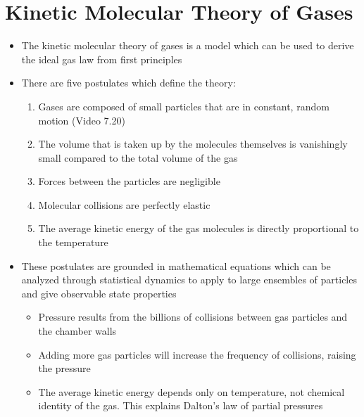 \documentclass[12pt, openany, letterpaper]{memoir}
\begin{document}
\section{Kinetic Molecular Theory of Gases}
\begin{itemize}
	\item The kinetic molecular theory of gases is a model which can be used to derive the ideal gas law from first principles
	\item There are five postulates which define the theory:
	      \begin{enumerate}
		      \item Gases are composed of small particles that are in constant, random motion (Video 7.20)
		      \item The volume that is taken up by the molecules themselves is vanishingly small compared to the total volume of the gas
		      \item Forces between the particles are negligible
		      \item Molecular collisions are perfectly elastic
		      \item The average kinetic energy of the gas molecules is directly proportional to the temperature
	      \end{enumerate}
	\item These postulates are grounded in mathematical equations which can be analyzed through statistical dynamics to apply to large ensembles of particles and give observable state properties
	      \begin{itemize}
		      \item Pressure results from the billions of collisions between gas particles and the chamber walls
		      \item Adding more gas particles will increase the frequency of collisions, raising the pressure
		      \item The average kinetic energy depends only on temperature, not chemical identity of the gas. This explains Dalton's law of partial pressures
	      \end{itemize}
\end{itemize}
\end{document}
